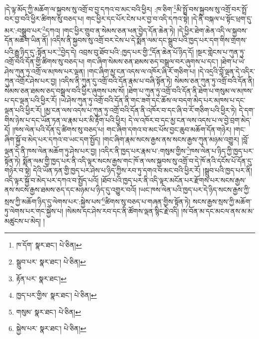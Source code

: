 །དེ་ལྟ་མོད་ཀྱི་མཆོག་ལ་སྐྱབས་སུ་འགྲོ་བ་བྱ་དཀའ་བ་མང་བའི་ཕྱིར། :ཁ་ཅིག་\footnote{ཁ་དོག་  སྣར་ཐང་།  པེ་ཅིན། }མི་སྤྲོ་བས་སྐྱབས་སུ་འགྲོ་བར་སྤྲོ་བར་བྱ་བའི་ཕྱིར་ཚིགས་སུ་བཅད་པ། གང་ཕྱིར་དང་པོར་ངེས་པར་བྱ་བ་འདི་དཀའ་སྟེ། །དེ་ནི་བསྐལ་པ་སྟོང་ཕྲག་དུ་མར་:བསྒྲུབ་པར་\footnote{སྒྲུབ་པར་  སྣར་ཐང་།  པེ་ཅིན། }དཀའ། །གང་ཕྱིར་གྲུབ་ན་སེམས་ཅན་ཕན་བྱེད་དོན་ཆེན་ཏེ། །དེ་ཕྱིར་ཐེག་ཆེན་འདི་ལ་སྐྱབས་དོན་མཆོག་ཡིན་ནོ། །འདིས་ནི་སྐྱབས་སུ་འགྲོ་བར་ངེས་པ་དེ་སྨོན་ལམ་དང་སྒྲུབ་པའི་ཁྱད་པར་དག་གིས་གྲགས་པའི་རྒྱུ་ཉིད་དུ་:སྟོན་པར་\footnote{རྟོན་པར་  སྣར་ཐང་། }བྱེད་དེ། འབྲས་བུ་ཐོབ་པའི་:ཁྱད་པར་གྱི་\footnote{ཁྱད་པར་གྱིས་  སྣར་ཐང་།  པེ་ཅིན། }དོན་ཆེན་པོ་ཉིད་དོ། །སྔར་གླེངས་པ་ཀུན་ཏུ་འགྲོ་བའི་དོན་གྱི་ཚིགས་སུ་བཅད་པ། གང་ཞིག་སེམས་ཅན་ཐམས་ཅད་བསྒྲལ་བར་ཞུགས་པ་དང་། །ཐེག་པ་ཡེ་ཤེས་ཀུན་ཏུ་འགྲོ་ལ་མཁས་པར་ལྡན། །གང་ཞིག་མྱ་ངན་འདས་ལ་འཁོར་ཞི་རོ་གཅིག་པ། །དེ་འདྲའི་བློ་ལྡན་དེ་འདིར་ཀུན་འགྲོར་ཤེས་པར་བྱ། །འདིས་ནི་ཀུན་དུ་འགྲོ་བའི་དོན་རྣམ་པ་བཞི་སྟོན་ཏེ། སེམས་ཅན་ཀུན་ཏུ་འགྲོ་བའི་དོན་ནི། སེམས་ཅན་ཐམས་ཅད་བསྒྲལ་བའི་ཕྱིར་ཞུགས་པས་སོ། །ཐེག་པ་ཀུན་ཏུ་འགྲོ་བའི་དོན་ནི་ཐེག་པ་གསུམ་ལ་མཁས་པ་དང་ལྡན་པའི་ཕྱིར་རོ། །ཡེ་ཤེས་ཀུན་ཏུ་འགྲོ་བའི་དོན་ནི་གང་ཟག་དང་ཆོས་ལ་བདག་མེད་པར་མཁས་པ་དང་ལྡན་པའི་ཕྱིར་རོ། །མྱ་ངན་ལས་འདས་པ་ཀུན་ཏུ་འགྲོ་བའི་དོན་ནི་འཁོར་བ་དང་ཞི་བ་རོ་གཅིག་པའི་ཕྱིར་ཏེ། དེ་དག་གིས་ཉེས་པ་དང་ཡོན་ཏན་ལ་རྣམ་པར་མི་རྟོག་པའི་ཕྱིར། དེ་ལ་འཁོར་བ་དང་མྱ་ངན་ལས་འདས་པ་ལ་བྱེ་བྲག་མེད་དོ། །ཁས་ལེན་པའི་དོན་དུ་ཚིགས་སུ་བཅད་པ། གང་ཞིག་དགའ་བ་མང་པོས་བྱང་ཆུབ་མཆོག་དོན་གཉེར། །གང་ཞིག་སྐྱོ་བ་མེད་པར་དཀའ་བ་ཡང་དག་སྤྱོད། །གང་ཞིག་རྣམ་སངས་རྒྱས་ནས་སངས་རྒྱས་ཀུན་མཉམ་འགྱུར། །བློ་ལྡན་དེ་ནི་ཁས་ལེན་མཆོག་ཏུ་ཤེས་པར་བྱ། །འདིར་ནི་ཁྱད་པར་རྣམ་པ་:གསུམ་གྱིས་\footnote{གསུམ་  སྣར་ཐང་།  པེ་ཅིན། }ཁས་ལེན་པ་ཉིད་ཀྱི་ཁྱད་པར་སྟོན་ཏེ། སྨོན་ལམ་གྱི་ཁྱད་པར་ནི་འདི་ལྟར་སངས་རྒྱས་གང་ཁོ་ན་ལས་སྐྱབས་སུ་འགྲོ་བ་དེ་ཁོ་ནའི་དངོས་པོ་དོན་དུ་གཉེར་བ་སྟེ། དེའི་ཡོན་ཏན་གྱི་ཁྱད་པར་ཤེས་པ་ཉིད་ཀྱིས་རབ་ཏུ་དགའ་བ་མང་བའི་ཕྱིར་རོ། །སྒྲུབ་པའི་ཁྱད་པར་ནི། འདི་ལྟར་སྐྱོ་བ་མེད་པར་དཀའ་བ་སྤྱོད་པའོ། །ཐོབ་པའི་ཁྱད་པར་ནི་འདི་ལྟར་མངོན་པར་རྫོགས་པར་སངས་རྒྱས་ནས་སངས་རྒྱས་ཐམས་ཅད་དང་མཉམ་པ་ཉིད་དུ་འགྱུར་བའོ། །ཡང་ཁས་ལེན་པའི་ཁྱད་པར་དེ་ཉིད་སངས་རྒྱས་ཀྱི་སྲས་ཀྱི་མཆོག་ཉིད་དུ་ལེགས་པར་:སྐྱེས་པས་\footnote{སྐྱེས་པར་  སྣར་ཐང་།  པེ་ཅིན། }ཚིགས་སུ་བཅད་པ་གཞན་གྱིས་སྟོན་ཏེ། སངས་རྒྱས་སྲས་ཀྱི་མཆོག་ཏུ་ལེགས་པར་གང་སྐྱེས་པ། །སེམས་དང་ཤེས་རབ་དང་ནི་ཚོགས་ལྡན་སྙིང་རྗེ་འདི། །ས་བོན་མ་དང་མངལ་ནས་མ་མ་མཚུངས་པ་མེད། །
